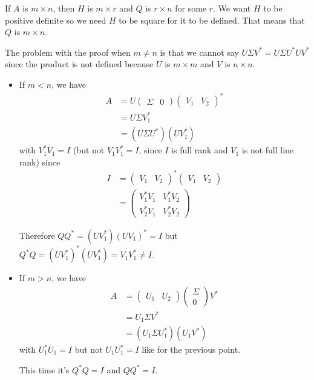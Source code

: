 \begin{solution}
  If $A$ is $m \times n$, then $H$ is $m \times r$ and $Q$ is $r \times n$ for some $r$.
  We want $H$ to be positive definite so we need $H$ to be square for it to be defined.
  That means that $Q$ is $m \times n$.

  The problem with the proof when $m \neq n$ is that we cannot say
  $U \Sigma V^* = U \Sigma U^* U V^*$ since the product is not defined because $U$ is $m \times m$
  and $V$ is $n \times n$.
  \begin{itemize}
    \item If $m < n$, we have
      \begin{align*}
        A
        & = U
        \begin{pmatrix}
          \Sigma & 0
        \end{pmatrix}
        \begin{pmatrix}
          V_1 & V_2
        \end{pmatrix}^*\\
        & = U \Sigma V_1^*\\
        & = (U \Sigma U^*) (U V_1^*)
      \end{align*}
      with $V_1^*V_1 = I$ (but not $V_1V_1^* = I$, since $I$ is full rank and $V_1$ is not full line rank)
      since
      \begin{align*}
        I
        & =
        \begin{pmatrix}
          V_1 & V_2
        \end{pmatrix}^*
        \begin{pmatrix}
          V_1 & V_2
        \end{pmatrix}\\
        & =
        \begin{pmatrix}
          V_1^*V_1 & V_1^*V_2\\
          V_2^*V_1 & V_2^*V_2
        \end{pmatrix}
      \end{align*}

      Therefore $QQ^* = (U V_1^*) (U V_1)^* = I$ but $Q^*Q = (U V_1^*)^* (U V_1^*) = V_1V_1^* \neq I$.
    \item If $m > n$, we have
      \begin{align*}
        A
        & =
        \begin{pmatrix}
          U_1 & U_2
        \end{pmatrix}
        \begin{pmatrix}
          \Sigma \\ 0
        \end{pmatrix}
        V^*\\
        & = U_1 \Sigma V^*\\
        & = (U_1 \Sigma U_1^*) (U_1 V^*)
      \end{align*}
      with $U_1^*U_1 = I$ but not $U_1U_1^* = I$ like for the previous point.

      This time it's $Q^*Q = I$ and $QQ^* = I$.
  \end{itemize}
\end{solution}

